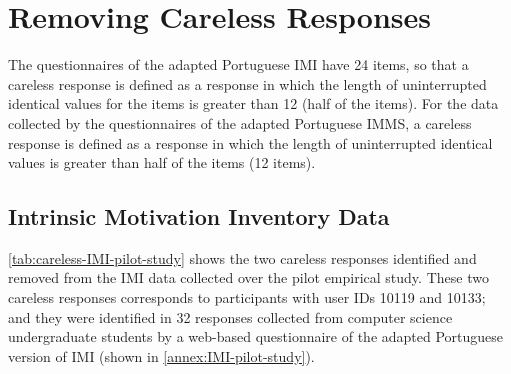 \section{Removing Careless Responses}
\label{subsec:removing-careless-motivation-survey}

The questionnaires of the adapted Portuguese IMI have 24 items, so that a careless response is defined as a response in which the length of uninterrupted identical values for the items is greater than 12 (half of the items). For the data collected by the questionnaires of the adapted Portuguese IMMS, a careless response is defined as a response in which the length of uninterrupted identical values is greater than half of the items (12 items).

\subsection{Intrinsic Motivation Inventory Data}

\autoref{tab:careless-IMI-pilot-study} shows the two careless responses identified and removed from the IMI data collected over the pilot empirical study. These two careless responses corresponds to participants with user IDs 10119 and 10133; and they were identified in 32 responses collected from computer science undergraduate students by a web-based questionnaire of the adapted Portuguese version of IMI (shown in \autoref{annex:IMI-pilot-study}).


